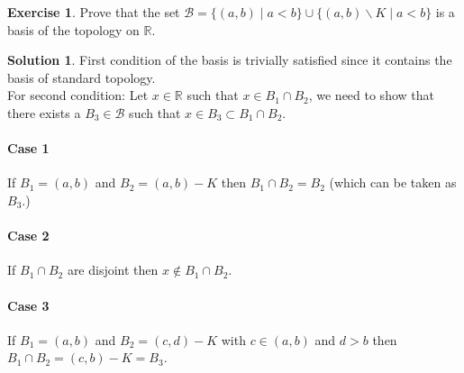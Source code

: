\documentclass[12pt,reqno]{amsart}
\theoremstyle{plain}
\theoremstyle{definition}
\newtheorem{exer}{Exercise}
\newtheorem*{sol*}{Solution}
\begin{document}
\begin{exer}
    Prove that the set $\mathcal{B} = \{(a,b) \mid a < b\} \cup \{(a,b) \backslash K \mid a < b\}$ is a basis of the topology on $\mathbb{R}$.
\end{exer}
\begin{sol*}
    First condition of the basis is trivially satisfied since it contains the basis of standard topology.\\
    For second condition: Let $x \in \mathbb{R}$ such that $x \in B_1 \cap B_2$, we need to show that there exists a $B_3 \in \mathcal{B}$ such that $x \in B_3 \subset B_1 \cap B_2$.
    \paragraph{\bf Case 1} If $B_1 = (a,b)$ and $B_2 = (a,b) - K$ then $B_1 \cap B_2 = B_2$ (which can be taken as $B_3$.)
    \paragraph{\bf Case 2} If $B_1 \cap B_2$ are disjoint then $x \notin B_1 \cap B_2$.
    \paragraph{\bf Case 3} If $B_1 = (a,b)$ and $B_2 = (c,d) - K$ with $c \in (a,b)$ and $d > b$ then $B_1 \cap B_2 = (c,b) - K = B_3$.
\end{sol*}
\end{document}
